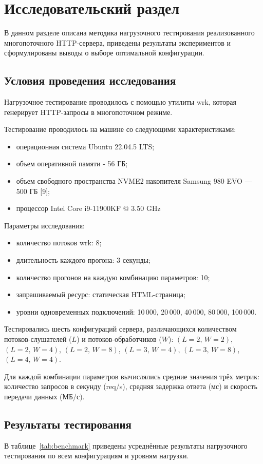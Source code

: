 \chapter{Исследовательский раздел}
В данном разделе описана методика нагрузочного тестирования
реализованного многопоточного HTTP-сервера,
приведены результаты экспериментов
и сформулированы выводы о выборе оптимальной конфигурации.

\section{Условия проведения исследования}
Нагрузочное тестирование проводилось с помощью утилиты wrk,
которая генерирует HTTP-запросы в многопоточном режиме.

Тестирование проводилось на машине со следующими характеристиками:
\begin{itemize}
	\item операционная система Ubuntu 22.04.5 LTS;
	\item объем оперативной памяти - 56 ГБ;
	\item объем свободного пространства NVME2 накопителя Samsung 980 EVO —
500 ГБ [9];
	\item процессор Intel Core i9-11900KF @ 3.50 GHz
\end{itemize}

Параметры исследования:
\begin{itemize}
	\item количество потоков wrk: 8;
	\item длительность каждого прогона: 3 секунды;
	\item количество прогонов на каждую комбинацию параметров: 10;
	\item запрашиваемый ресурс: статическая HTML-страница;
	\item уровни одновременных подключений: 10\,000, 20\,000, 40\,000, 80\,000, 100\,000.
\end{itemize}



Тестировались шесть конфигураций сервера,
различающихся количеством потоков-слушателей ($L$)
и потоков-обработчиков ($W$):
$(L{=}2,\,W{=}2)$,
$(L{=}2,\,W{=}4)$,
$(L{=}2,\,W{=}8)$,
$(L{=}3,\,W{=}4)$,
$(L{=}3,\,W{=}8)$,
$(L{=}4,\,W{=}4)$.

Для каждой комбинации параметров вычислялись средние значения
трёх метрик: количество запросов в секунду (req/s),
средняя задержка ответа (мс) и скорость передачи данных (МБ/с).

\section{Результаты тестирования}
В таблице~\ref{tab:benchmark} приведены усреднённые результаты
нагрузочного тестирования по всем конфигурациям и уровням нагрузки.

